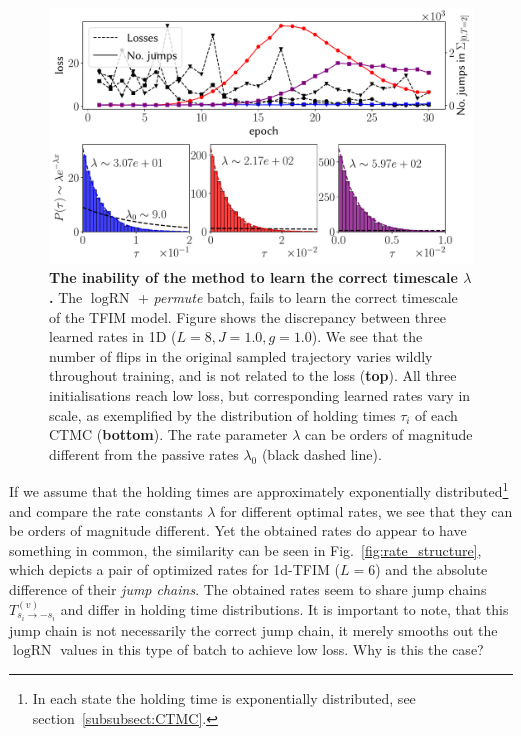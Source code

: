 \begin{figure}[t]
	\centering
	\includegraphics[width=\linewidth]{Chapter5/Figs/Vector/scale_blowup}
	\caption[The inability of the method to learn the correct timescale $\lambda$]{\textbf{The inability of the method to learn the correct timescale $\lambda$.} The $\log \text{RN}$ + \emph{permute} batch, fails to learn the correct timescale of the TFIM model. Figure shows the discrepancy between three learned rates in 1D ($L=8, J=1.0, g=1.0$). We see that the number of flips in the original sampled trajectory varies wildly throughout training, and is not related to the loss (\textbf{top}). All three initialisations reach low loss, but corresponding learned rates vary in scale, as exemplified by the distribution of holding times $\tau_i$ of each CTMC (\textbf{bottom}). The rate parameter $\lambda$ can be orders of magnitude different from the passive rates $\lambda_0$ (black dashed line).}
	\label{fig:scaleblowup}
\end{figure}
If we assume that the holding times are approximately exponentially distributed\footnote{In each state the holding time is exponentially distributed, see section~\ref{subsubsect:CTMC}.} and compare the rate constants $\lambda$ for different optimal rates, we see that they can be orders of magnitude different. Yet the obtained rates do appear to have something in common, the similarity can be seen in Fig.~\ref{fig:rate_structure}, which depicts a pair of optimized rates for 1d-TFIM ($L=6$) and the absolute difference of their \emph{jump chains}. The obtained rates seem to share jump chains $T^{(v)}_{s_i \rightarrow -s_i}$ and differ in holding time distributions. It is important to note, that this jump chain is not necessarily the correct jump chain, it merely smooths out the $\log \text{RN}$ values in this type of batch to achieve low loss. Why is this the case?
